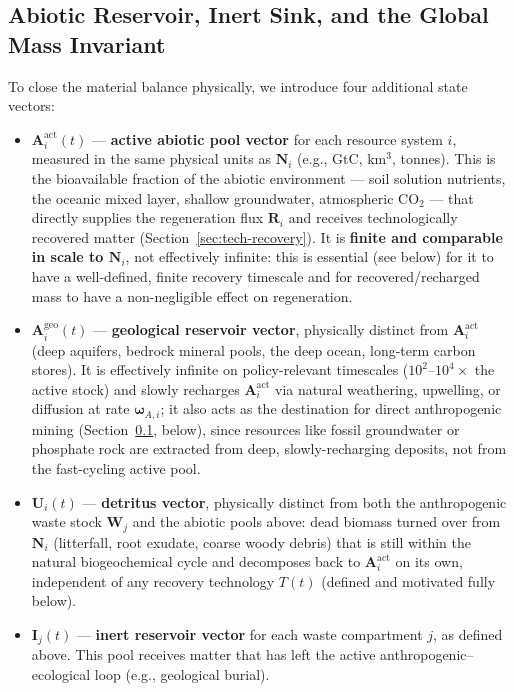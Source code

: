 \documentclass[twocolumn,10pt]{article}
\begin{document}
\subsection{Abiotic Reservoir, Inert Sink, and the Global Mass Invariant}
\label{sec:abiotic}
To close the material balance physically, we introduce four additional state vectors:
\begin{itemize}
    \item $\mathbf{A}^{\text{act}}_i(t)$ --- \textbf{active abiotic pool vector} for each resource system $i$, measured in the same physical units as $\mathbf{N}_i$ (e.g., GtC, km$^3$, tonnes). This is the bioavailable fraction of the abiotic environment — soil solution nutrients, the oceanic mixed layer, shallow groundwater, atmospheric $\text{CO}_2$ — that directly supplies the regeneration flux $\mathbf{R}_i$ and receives technologically recovered matter (Section~\ref{sec:tech-recovery}). It is \textbf{finite and comparable in scale to $\mathbf N_i$}, not effectively infinite: this is essential (see below) for it to have a well-defined, finite recovery timescale and for recovered/recharged mass to have a non-negligible effect on regeneration.
    \item $\mathbf{A}^{\text{geo}}_i(t)$ --- \textbf{geological reservoir vector}, physically distinct from $\mathbf A^{\text{act}}_i$ (deep aquifers, bedrock mineral pools, the deep ocean, long-term carbon stores). It is effectively infinite on policy-relevant timescales ($10^2$--$10^4\times$ the active stock) and slowly recharges $\mathbf A^{\text{act}}_i$ via natural weathering, upwelling, or diffusion at rate $\boldsymbol\omega_{A,i}$; it also acts as the destination for direct anthropogenic mining (Section~\ref{sec:abiotic}, below), since resources like fossil groundwater or phosphate rock are extracted from deep, slowly-recharging deposits, not from the fast-cycling active pool.
    \item $\mathbf{U}_i(t)$ --- \textbf{detritus vector}, physically distinct from both the anthropogenic waste stock $\mathbf W_j$ and the abiotic pools above: dead biomass turned over from $\mathbf N_i$ (litterfall, root exudate, coarse woody debris) that is still within the natural biogeochemical cycle and decomposes back to $\mathbf A^{\text{act}}_i$ on its own, independent of any recovery technology $T(t)$ (defined and motivated fully below).
    \item $\mathbf{I}_j(t)$ --- \textbf{inert reservoir vector} for each waste compartment $j$, as defined above. This pool receives matter that has left the active anthropogenic--ecological loop (e.g., geological burial).
\end{itemize}
\end{document}
